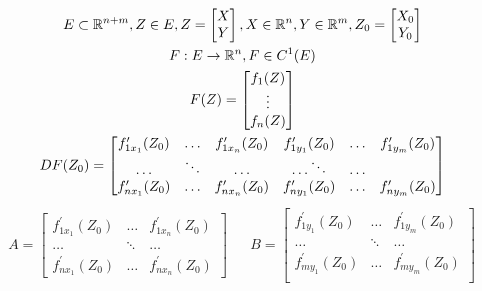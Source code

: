 \documentclass[main]{subfiles}
\begin{document}
      \begin{theorem}
         \begin{gather*}
         E \subset {\vR}^{n+m}, Z \in E, Z = \begin{bmatrix*}
            X \\
            Y
         \end{bmatrix*},
         X \in {\vR}^n, Y \in {\vR}^m, Z_0 = \begin{bmatrix*}
            X_0 \\
            Y_0
         \end{bmatrix*} \\
          F: E \rightarrow {\vR}^n, F \in C^1(E) \\
         F(Z) = \begin{bmatrix*}
            f_1(Z) \\
            \vdots \\
            f_n(Z)
         \end{bmatrix*} \\
         DF(Z_0) = \begin{bmatrix*}
            f^\prime_{1x_1}(Z_0) & \ldots & f^\prime_{1x_n}(Z_0) & f^\prime_{1y_1}(Z_0) & \ldots & f^\prime_{1y_m}(Z_0) \\
            \ldots & \ddots & \ldots & \ldots \ddots & \ldots \\
            f^\prime_{nx_1}(Z_0) & \ldots & f^\prime_{nx_n}(Z_0) & f^\prime_{ny_1}(Z_0) & \ldots & f^\prime_{ny_m}(Z_0) 
         \end{bmatrix*} 
      \end{gather*}
         \begin{align*}
            A = \begin{bmatrix*}
               f^\prime_{1x_1}(Z_0) & \ldots & f^\prime_{1x_n}(Z_0) \\
               \ldots & \ddots & \ldots \\
               f^\prime_{nx_1}(Z_0) & \ldots & f^\prime_{nx_n}(Z_0)
            \end{bmatrix*} && B =
            \begin{bmatrix*}
               f^\prime_{1y_1}(Z_0) & \ldots & f^\prime_{1y_m}(Z_0) \\
               \ldots & \ddots & \ldots \\
               f^\prime_{my_1}(Z_0) & \ldots & f^\prime_{my_m}(Z_0) \\
            \end{bmatrix*}
         \end{align*}


\end{theorem}
\end{document}
